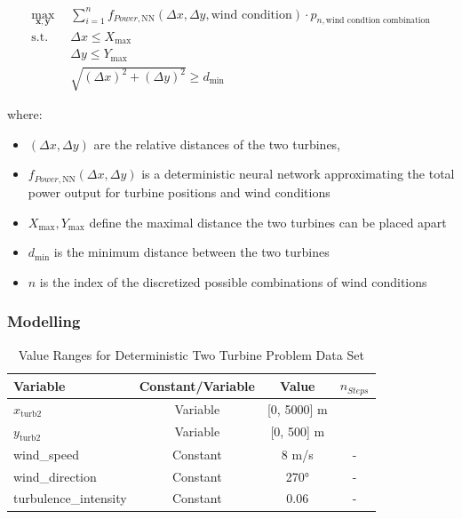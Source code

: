\begin{align}
	\max_{\mathbf{x}, \mathbf{y}} &  \sum_{i=1}^{n} f_{Power,\text{NN}}(\Delta x, \Delta y, \text{wind condition})\cdot p_{n,\text{wind condtion combination}} \\
	\text{s.t.} \quad 
	&  \Delta x \leq X_{\max} \\
	&  \Delta y \leq Y_{\max} \\
	& \sqrt{(\Delta x)^2 + (\Delta y)^2} \geq d_{\min}
\end{align}

where:
\begin{itemize}
	\item \( (\Delta x, \Delta y) \) are the relative distances of the two turbines,
	\item \( f_{Power, \text{NN}}(\Delta x, \Delta y)\) is a deterministic neural network  approximating the total power output for turbine positions and wind conditions
	\item \(  X_{\max}, Y_{\max} \) define the maximal distance the two turbines can be placed apart
	\item \( d_{\min} \) is the minimum distance between the two turbines
	\item \( n \) is the index of the discretized possible combinations of wind conditions 
\end{itemize}


\subsubsection{Modelling}

\begin{table}[ht]
	\centering
	\caption{Value Ranges for Deterministic Two Turbine Problem Data Set}
	\begin{tabular}{|l|c|c|c|}
		\hline
		\textbf{Variable} & \textbf{Constant/Variable} & \textbf{Value} & \textbf{$n_{Steps}$}\\
		\hline
		$x_{\text{turb2}}$ & Variable & [0, 5000] m &\\
		$y_{\text{turb2}}$ & Variable & [0, 500] m &\\
		wind\_speed & Constant & 8 m/s & -\\
		wind\_direction & Constant & 270°&- \\
		turbulence\_intensity & Constant & 0.06 & - \\
		\hline
	\end{tabular}
	\label{tab:val_determ_data}
\end{table}


